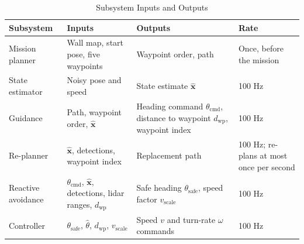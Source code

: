 \begin{table}[t]
    \centering
    \caption{Subsystem Inputs and Outputs}
    \label{tab:io}
    \footnotesize
    \begin{tabularx}{\textwidth}{@{}l X X l@{}}
        \toprule
        \textbf{Subsystem} & \textbf{Inputs} & \textbf{Outputs} & \textbf{Rate} \\
        \midrule
        Mission planner    & Wall map, start pose, five waypoints & Waypoint order, path & Once, before the mission \\
        State estimator    & Noisy pose and speed & State estimate $\hat{\mathbf{x}}$ & 100 Hz \\
        Guidance           & Path, waypoint order, $\hat{\mathbf{x}}$ & Heading command $\theta_{\text{cmd}}$, distance to waypoint $d_{\text{wp}}$, waypoint index & 100 Hz \\
        Re-planner         & $\hat{\mathbf{x}}$, detections, waypoint index & Replacement path & 100 Hz; re-plans at most once per second \\
        Reactive avoidance & $\theta_{\text{cmd}}$, $\hat{\mathbf{x}}$, detections, lidar ranges, $d_{\text{wp}}$ & Safe heading $\theta_{\text{safe}}$, speed factor $v_{\text{scale}}$ & 100 Hz \\
        Controller         & $\theta_{\text{safe}}$, $\hat{\theta}$, $d_{\text{wp}}$, $v_{\text{scale}}$ & Speed $v$ and turn-rate $\omega$ commands & 100 Hz \\
        \bottomrule
    \end{tabularx}
\end{table}
